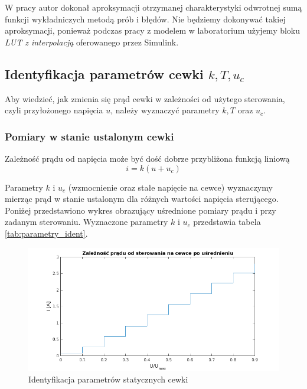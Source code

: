 W pracy \cite{Bania1999} autor dokonał aproksymacji otrzymanej charakterystyki odwrotnej sumą funkcji wykładniczych metodą prób i błędów. Nie będziemy dokonywać takiej aproksymacji, ponieważ podczas pracy z modelem w laboratorium użyjemy bloku \textit{LUT z interpolacją} oferowanego przez Simulink.



\subsection{Identyfikacja parametrów cewki $k, T, u_c$ }

Aby wiedzieć, jak zmienia się prąd cewki w zależności od użytego sterowania, czyli przyłożonego napięcia $u$, należy wyznaczyć parametry $k, T$ oraz $u_c$.

\subsubsection{Pomiary w stanie ustalonym cewki}

Zależność prądu od napięcia może być dość dobrze przybliżona funkcją liniową
\begin{equation}
i = k(u + u_c)
\end{equation}

Parametry $k$ i $u_c$ (wzmocnienie oraz stałe napięcie na cewce) wyznaczymy mierząc prąd w stanie ustalonym dla różnych wartości napięcia sterującego. Poniżej przedstawiono wykres obrazujący uśrednione pomiary prądu i przy zadanym sterowaniu. Wyznaczone parametry $k$ i $u_c$ przedstawia tabela \ref{tab:parametry_ident}.


\begin{figure}[!htb]
\centering
\includegraphics[scale=0.85]{img/prad_cewki_od_sterowania.png}
\caption{Identyfikacja parametrów statycznych cewki}
\label{rys:cewka_k_uc}
\end{figure}

